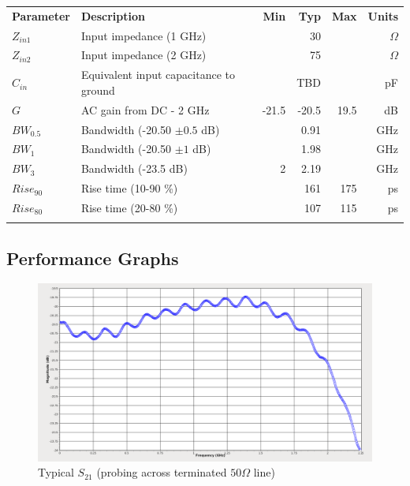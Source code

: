 \documentclass[11pt]{article}
\newcommand{\thinhline}{\Xhline{1\arrayrulewidth}}
\newcommand{\thickhline}{\Xhline{2.5\arrayrulewidth}}
\begin{document}
\begin{tabularx}{16cm}{lXrrrr}
\thickhline
\textbf{Parameter} & \textbf{Description} & \textbf{Min} & \textbf{Typ} & \textbf{Max} & \textbf{Units} \\
\thickhline
$Z_{in1}$ & Input impedance (1 GHz) & & 30 & & $\Omega$ \\
\thinhline
$Z_{in2}$ & Input impedance (2 GHz) & & 75 & & $\Omega$ \\
\thinhline
$C_{in}$ & Equivalent input capacitance to ground &  & TBD &  & pF \\
\thinhline
$G$ & AC gain from DC - 2 GHz & -21.5 & -20.5 & 19.5 & dB \\
\thinhline
$BW_{0.5}$ & Bandwidth (-20.50 $\pm 0.5$ dB) &  & 0.91 & & GHz \\
\thinhline
$BW_{1}$ & Bandwidth (-20.50 $\pm 1$ dB) &  & 1.98 &  & GHz \\
\thinhline
$BW_{3}$ & Bandwidth (-23.5 dB) & 2 & 2.19 &  & GHz \\
\thinhline
$Rise_{90}$ & Rise time (10-90 \%) &  & 161 & 175 & ps \\
\thinhline
$Rise_{80}$ & Rise time (20-80 \%) &  & 107 & 115 & ps \\
\thickhline
\end{tabularx}

\pagebreak
\subsection{Performance Graphs}

\begin{figure}[h]
\centering
\includegraphics[width=15cm]{typical-s21.png}
\caption{Typical $S_{21}$ (probing across terminated $50 \Omega$ line) }
\label{typical-s21}
\end{figure}
\end{document}
